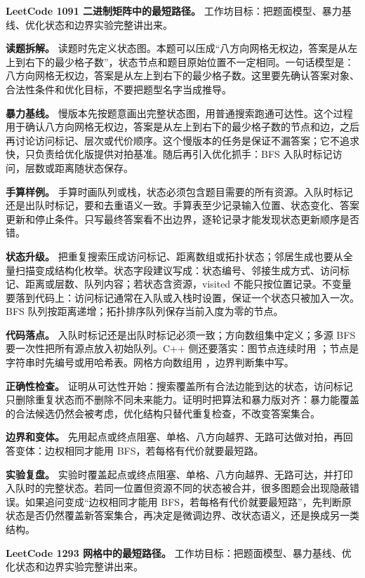 \noindent\textbf{LeetCode 1091 二进制矩阵中的最短路径。} 工作坊目标：把题面模型、暴力基线、优化状态和边界实验完整讲出来。

\textbf{读题拆解。} 读题时先定义状态图。本题可以压成“八方向网格无权边，答案是从左上到右下的最少格子数”，状态节点和题目原始位置不一定相同。一句话模型是：八方向网格无权边，答案是从左上到右下的最少格子数。这里要先确认答案对象、合法性条件和优化目标，不要把题型名字当成推导。

\textbf{暴力基线。} 慢版本先按题意画出完整状态图，用普通搜索跑通可达性。这个过程用于确认八方向网格无权边，答案是从左上到右下的最少格子数的节点和边，之后再讨论访问标记、层次或代价顺序。这个慢版本的任务是保证不漏答案；它不追求快，只负责给优化版提供对拍基准。随后再引入优化抓手：BFS 入队时标记访问，层数或距离随状态保存。

\textbf{手算样例。} 手算时画队列或栈，状态必须包含题目需要的所有资源。入队时标记还是出队时标记，要和去重语义一致。手算表至少记录输入位置、状态变化、答案更新和停止条件。只写最终答案看不出边界，逐轮记录才能发现状态更新顺序是否错。

\textbf{状态升级。} 把重复搜索压成访问标记、距离数组或拓扑状态；邻居生成也要从全量扫描变成结构化枚举。状态字段建议写成：状态编号、邻接生成方式、访问标记、距离或层数、队列内容；若状态含资源，visited 不能只按位置记录。不变量要落到代码上：访问标记通常在入队或入栈时设置，保证一个状态只被加入一次。BFS 队列按距离递增；拓扑排序队列保存当前入度为零的节点。

\textbf{代码落点。} 入队时标记还是出队时标记必须一致；方向数组集中定义；多源 BFS 要一次性把所有源点放入初始队列。C++ 侧还要落实：图节点连续时用 ；节点是字符串时先编号或用哈希表。网格方向数组用 ，边界判断集中写。

\textbf{正确性检查。} 证明从可达性开始：搜索覆盖所有合法边能到达的状态，访问标记只删除重复状态而不删除不同未来能力。证明时把算法和暴力版对齐：暴力能覆盖的合法候选仍然会被考虑，优化结构只替代重复检查，不改变答案集合。

\textbf{边界和变体。} 先用起点或终点阻塞、单格、八方向越界、无路可达做对拍，再回答变体：边权相同才能用 BFS，若每格有代价就要最短路。

\textbf{实验复盘。} 实验时覆盖起点或终点阻塞、单格、八方向越界、无路可达，并打印入队时的完整状态。若同一位置但资源不同的状态被合并，很多图题会出现隐蔽错误。如果追问变成“边权相同才能用 BFS，若每格有代价就要最短路”，先判断原状态是否仍然覆盖新答案集合，再决定是微调边界、改状态语义，还是换成另一类结构。

\noindent\textbf{LeetCode 1293 网格中的最短路径。} 工作坊目标：把题面模型、暴力基线、优化状态和边界实验完整讲出来。

